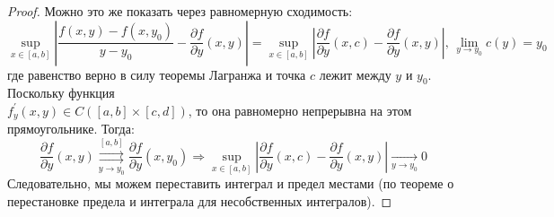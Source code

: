 \documentclass[12pt]{article}
\theoremstyle{definition}
\newcommand{\uconvm}[2]{\overset{#1}{\underset{#2}{\rightrightarrows}}}
\begin{document}
\begin{proof}
	Можно это же показать через равномерную сходимость:
	$$
		\sup\limits_{x \in [a,b]}\left| \dfrac{f(x,y) - f(x,y_0)}{y - y_0} - \dfrac{\partial f}{\partial y}(x,y) \right| = \sup\limits_{x \in [a,b]}\left| \dfrac{\partial f}{\partial y}(x,c) - \dfrac{\partial f}{\partial y}(x,y) \right|, \, \lim\limits_{y\to y_0}c(y) = y_0
	$$
	где равенство верно в силу теоремы Лагранжа и точка $c$ лежит между $y$ и $y_0$. Поскольку функция \\ $f_y^\prime(x,y) \in C([a,b]\times [c,d])$, то она равномерно непрерывна на этом прямоугольнике. Тогда:
	$$
		\dfrac{\partial f}{\partial y}(x,y) \uconvm{[a,b]}{y\to y_0} \dfrac{\partial f}{\partial y}(x,y_0) \Rightarrow
		\sup\limits_{x \in [a,b]}\left| \dfrac{\partial f}{\partial y}(x,c) - \dfrac{\partial f}{\partial y}(x,y) \right| \xrightarrow[y \to y_0]{}0
	$$
	Следовательно, мы можем переставить интеграл и предел местами (по теореме о перестановке предела и интеграла для несобственных интегралов).
\end{proof}
\end{document}
